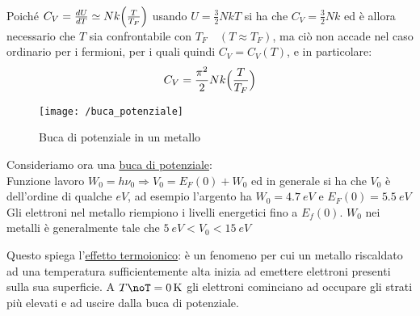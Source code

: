 Poiché $C_V = \frac{ dU}{dT} \simeq N k \Bigl(  \frac{ T}{T_F}  \Bigr) $ usando $U = \frac{ 3}{2} N k T$ si ha che $C_V = \frac{ 3}{2} N k$ 
ed è allora necessario che $T$ sia confrontabile con $T_F \quad (T \approx T_F)$, ma ciò non accade nel caso ordinario per i fermioni,
per i quali quindi $C_V = C_V(T)$, e in particolare:
\begin{equation}
C_V = \frac{ \pi^2}{2} N k \Bigl(  \frac{ T}{T_F}  \Bigr)
\end{equation}

\begin{figure}[h]
\centering
\texttt{[image: /buca\_potenziale]}
\caption{Buca di potenziale in un metallo}
\end{figure}

Consideriamo ora una \underline{buca di potenziale}: \\

Funzione lavoro $W_0 = h\nu_0 \Rightarrow V_0 = E_F(0) + W_0$ ed in generale si ha che $V_0$ è dell'ordine di qualche $eV$,
ad esempio l'argento ha $W_0 = \SI{4.7}{eV}$ e $ E_F(0) = \SI{5.5}{eV} $
Gli elettroni nel metallo riempiono i livelli energetici fino a $E_f(0)$. 
$W_0$ nei metalli è generalmente tale che $\SI{5}{eV} < V_0 < \SI{15}{eV} $

Questo spiega l'\underline{effetto termoionico}: è un fenomeno per cui un metallo riscaldato ad una temperatura sufficientemente alta inizia ad emettere elettroni presenti sulla sua superficie. A $T \noT=\SI{0}{K} $ gli elettroni cominciano ad occupare gli strati più elevati e ad uscire dalla buca di potenziale.

\fi














